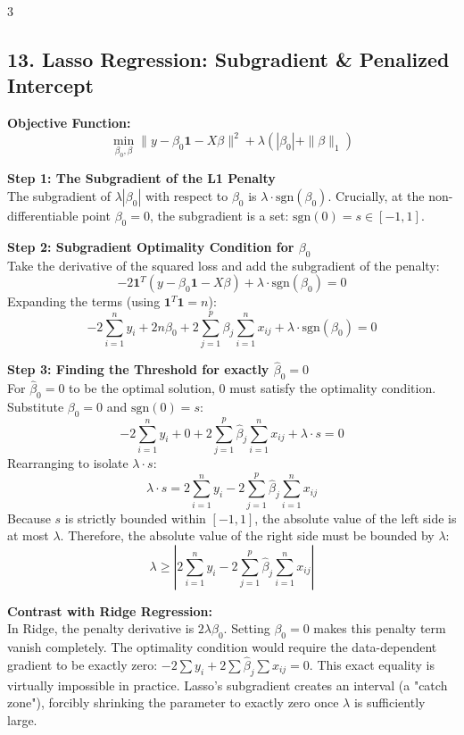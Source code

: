 \documentclass[10pt,landscape]{article}
\begin{document}
\begin{multicols*}{3}
\subsection*{13. Lasso Regression: Subgradient \& Penalized Intercept}

\textbf{Objective Function:}
$$ \min_{\beta_0, \beta} \|y - \beta_0 \mathbf{1} - X\beta\|^2 + \lambda(|\beta_0| + \|\beta\|_1) $$

\textbf{Step 1: The Subgradient of the L1 Penalty} \\
The subgradient of $\lambda|\beta_0|$ with respect to $\beta_0$ is $\lambda \cdot \text{sgn}(\beta_0)$.
Crucially, at the non-differentiable point $\beta_0 = 0$, the subgradient is a set: $\text{sgn}(0) = s \in [-1, 1]$.

\textbf{Step 2: Subgradient Optimality Condition for $\beta_0$} \\
Take the derivative of the squared loss and add the subgradient of the penalty:
$$ -2\mathbf{1}^T(y - \beta_0 \mathbf{1} - X\beta) + \lambda \cdot \text{sgn}(\beta_0) = 0 $$
Expanding the terms (using $\mathbf{1}^T \mathbf{1} = n$):
$$ -2\sum_{i=1}^n y_i + 2n\beta_0 + 2\sum_{j=1}^p \beta_j \sum_{i=1}^n x_{ij} + \lambda \cdot \text{sgn}(\beta_0) = 0 $$

\textbf{Step 3: Finding the Threshold for exactly $\hat{\beta}_0 = 0$} \\
For $\hat{\beta}_0 = 0$ to be the optimal solution, 0 must satisfy the optimality condition. Substitute $\beta_0 = 0$ and $\text{sgn}(0) = s$:
$$ -2\sum_{i=1}^n y_i + 0 + 2\sum_{j=1}^p \hat{\beta}_j \sum_{i=1}^n x_{ij} + \lambda \cdot s = 0 $$
Rearranging to isolate $\lambda \cdot s$:
$$ \lambda \cdot s = 2\sum_{i=1}^n y_i - 2\sum_{j=1}^p \hat{\beta}_j \sum_{i=1}^n x_{ij} $$
Because $s$ is strictly bounded within $[-1, 1]$, the absolute value of the left side is at most $\lambda$. Therefore, the absolute value of the right side must be bounded by $\lambda$:
$$ \lambda \ge \left| 2\sum_{i=1}^n y_i - 2\sum_{j=1}^p \hat{\beta}_j \sum_{i=1}^n x_{ij} \right| $$

\textbf{Contrast with Ridge Regression:} \\
In Ridge, the penalty derivative is $2\lambda\beta_0$. Setting $\beta_0=0$ makes this penalty term vanish completely. The optimality condition would require the data-dependent gradient to be exactly zero: $-2\sum y_i + 2\sum \hat{\beta}_j \sum x_{ij} = 0$. This exact equality is virtually impossible in practice. Lasso's subgradient creates an interval (a "catch zone"), forcibly shrinking the parameter to exactly zero once $\lambda$ is sufficiently large.



\end{multicols*}
\end{document}
